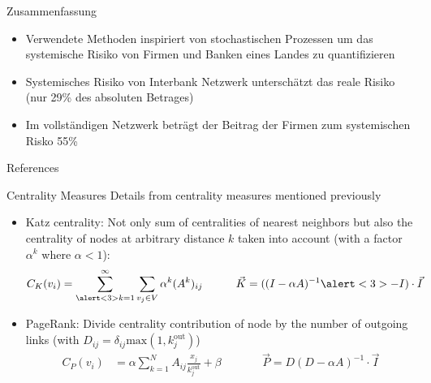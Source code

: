 \documentclass[]{beamer}
\begin{document}
\begin{frame}{Zusammenfassung}
	\begin{itemize}
		\item Verwendete Methoden inspiriert von stochastischen Prozessen um das systemische Risiko von Firmen und Banken eines Landes zu quantifizieren
		\bigskip
		\item Systemisches Risiko von Interbank Netzwerk unterschätzt das reale Risiko (nur 29\% des absoluten Betrages)
		\item Im vollständigen Netzwerk beträgt der Beitrag der Firmen zum systemischen Risko 55\%
	\end{itemize}
\end{frame}



\appendix

\begin{frame}[allowframebreaks]{References}
	\nocite{newman_networks:_2010}
	
%	
\end{frame}


\begin{frame}{Centrality Measures}
	Details from centrality measures mentioned previously
	\begin{itemize}
		\item Katz centrality: Not only sum of centralities of nearest neighbors but also the centrality of nodes at arbitrary distance $k$ taken into account (with a factor $\alpha^k$ where $\alpha<1$):
		\begin{align*}
		C_K(v_i) &= \sum_{\alert<3>{k=1}}^\infty\sum_{v_j\in V}\alpha^k (A^k)_{ij} \qquad
		&&
			\vec K = ((I - \alpha A)^{-1} \alert<3>{-I})\cdot\vec I
		\end{align*}
		\item PageRank: Divide centrality contribution of node by the number of outgoing links (with $D_{ij} = \delta_{ij}\mathrm{max}(1,k_j^\text{out})$)
		\begin{align*}
			C_P(v_i) &=  \alpha\sum_{k=1}^N A_{ij}\frac{x_j}{k_j^\text{out}} +  \beta\qquad
			&&
			\vec P = D(D - \alpha A)^{-1}\cdot\vec I
		\end{align*}
	\end{itemize}
\end{frame}	
\end{document}
